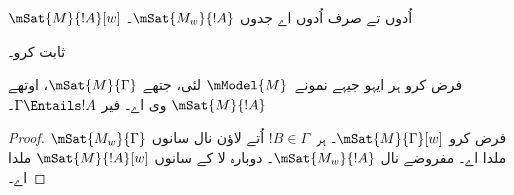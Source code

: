 \documentclass[../../../include/open-logic-section]{subfiles}
\begin{document}
\begin{prop}
  $\mSat{M}{!A}[w]$ اُدوں تے صرف اُدوں اے جدوں $\mSat{M_w}{!A}$۔
\end{prop}

\begin{prob}
   ثابت کرو۔
\end{prob}

\begin{prop}
  فرض کرو ہر ایہو جیہے نمونے~$\mModel{M}$ لئی، جتھے $\mSat{M}{\Gamma}$،
  اوتھے $\mSat{M}{!A}$ وی اے۔ فیر $\Gamma \Entails !A$۔
\end{prop}

\begin{proof}
  فرض کرو $\mSat{M}{\Gamma}[w]$۔  ہر~$!B \in \Gamma$ اُتے
  لاؤن نال سانوں $\mSat{M_w}{\Gamma}$ ملدا اے۔ مفروضے نال $\mSat{M_w}{!A}$۔
   دوبارہ لا کے سانوں $\mSat{M}{!A}[w]$ ملدا اے۔
\end{proof}
\end{document}
